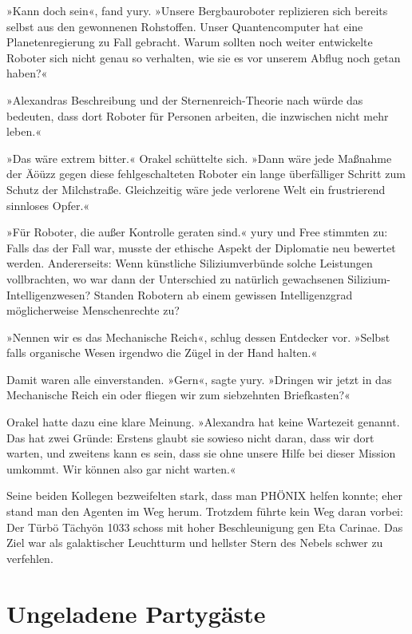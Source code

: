 »Kann doch sein«, fand yury. »Unsere Bergbauroboter replizieren sich bereits selbst aus den gewonnenen Rohstoffen. Unser Quantencomputer hat eine Planetenregierung zu Fall gebracht. Warum sollten noch weiter entwickelte Roboter sich nicht genau so verhalten, wie sie es vor unserem Abflug noch getan haben?«

»Alexandras Beschreibung und der Sternenreich-Theorie nach würde das bedeuten, dass dort Roboter für Personen arbeiten, die inzwischen nicht mehr leben.«

»Das wäre extrem bitter.« Orakel schüttelte sich. »Dann wäre jede Maßnahme der Äöüzz gegen diese fehlgeschalteten Roboter ein lange überfälliger Schritt zum Schutz der Milchstraße. Gleichzeitig wäre jede verlorene Welt ein frustrierend sinnloses Opfer.«

»Für Roboter, die außer Kontrolle geraten sind.« yury und Free stimmten zu: Falls das der Fall war, musste der ethische Aspekt der Diplomatie neu bewertet werden. Andererseits: Wenn künstliche Siliziumverbünde solche Leistungen vollbrachten, wo war dann der Unterschied zu natürlich gewachsenen Silizium-Intelligenzwesen? Standen Robotern ab einem gewissen Intelligenzgrad möglicherweise Menschenrechte zu?

»Nennen wir es das Mechanische Reich«, schlug dessen Entdecker vor. »Selbst falls organische Wesen irgendwo die Zügel in der Hand halten.«

Damit waren alle einverstanden. »Gern«, sagte yury. »Dringen wir jetzt in das Mechanische Reich ein oder fliegen wir zum siebzehnten Briefkasten?«

Orakel hatte dazu eine klare Meinung. »Alexandra hat keine Wartezeit genannt. Das hat zwei Gründe: Erstens glaubt sie sowieso nicht daran, dass wir dort warten, und zweitens kann es sein, dass sie ohne unsere Hilfe bei dieser Mission umkommt. Wir können also gar nicht warten.«

Seine beiden Kollegen bezweifelten stark, dass man PHÖNIX helfen konnte; eher stand man den Agenten im Weg herum. Trotzdem führte kein Weg daran vorbei: Der Türbö Tächyön 1033 schoss mit hoher Beschleunigung gen Eta Carinae. Das Ziel war als galaktischer Leuchtturm und hellster Stern des Nebels schwer zu verfehlen.


\chapter{Ungeladene Partygäste}

